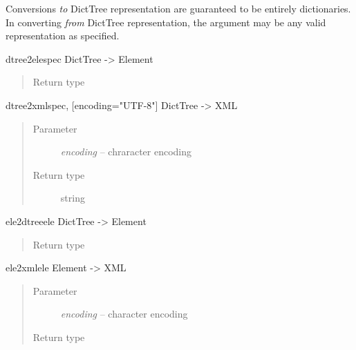 \documentclass[a4paper,10pt,english]{manual}
\begin{document}
Conversions \emph{to} DictTree representation are guaranteed to be entirely dictionaries. In converting \emph{from} DictTree representation, the argument may be any valid representation as specified.

\hypertarget{ncclient.content.dtree2ele}{}\begin{funcdesc}{dtree2ele}{spec}
DictTree -\textgreater{} Element
\begin{quote}\begin{description}
\item[Return type]
\href{http://docs.python.org/library/xml.etree.elementtree.html\#xml.etree.ElementTree.Element}{}

\end{description}\end{quote}
\end{funcdesc}

\hypertarget{ncclient.content.dtree2xml}{}\begin{funcdesc}{dtree2xml}{spec, {[}encoding="UTF-8"{]}}
DictTree -\textgreater{} XML
\begin{quote}\begin{description}
\item[Parameter]
\emph{encoding} -- chraracter encoding

\item[Return type]
string

\end{description}\end{quote}
\end{funcdesc}

\hypertarget{ncclient.content.ele2dtree}{}\begin{funcdesc}{ele2dtree}{ele}
DictTree -\textgreater{} Element
\begin{quote}\begin{description}
\item[Return type]
\href{http://docs.python.org/library/stdtypes.html\#dict}{}

\end{description}\end{quote}
\end{funcdesc}

\hypertarget{ncclient.content.ele2xml}{}\begin{funcdesc}{ele2xml}{ele}
Element -\textgreater{} XML
\begin{quote}\begin{description}
\item[Parameter]
\emph{encoding} -- character encoding

\item[Return type]
\href{http://docs.python.org/library/string.html\#string}{}

\end{description}\end{quote}
\end{funcdesc}
\end{document}
